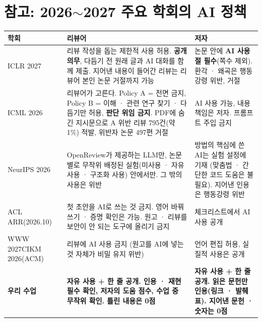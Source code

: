 \documentclass[11pt]{article}
\begin{document}
\section*{참고: 2026$\sim$2027 주요 학회의 AI 정책}
\begin{center}
\scriptsize
\renewcommand{\arraystretch}{1.35}
\begin{tabular}{@{}>{\raggedright\arraybackslash}p{2.0cm}>{\raggedright\arraybackslash}p{5.9cm}>{\raggedright\arraybackslash}p{5.3cm}@{}}
\toprule
\textbf{학회} & \textbf{리뷰어} & \textbf{저자} \\
\midrule
ICLR 2027 & 리뷰 작성을 돕는 제한적 사용 허용. \textbf{공개 의무}, 다듬기 전 원래 글과 AI 대화를 함께 제출. 지어낸 내용이 들어간 리뷰는 리뷰어 본인 논문 거절까지 가능 & 논문 안에 \textbf{AI 사용 절 필수}(쪽수 제외). 환각 · 왜곡은 행동강령 위반, 거절 \\
ICML 2026 & 리뷰어가 고른다. Policy A = 전면 금지, Policy B = 이해 · 관련 연구 찾기 · 다듬기만 허용, \textbf{판단 위임 금지}. PDF에 숨긴 지시문으로 A 위반 리뷰 795건(약 1\%) 적발, 위반자 논문 497편 거절 & AI 사용 가능, 내용 책임은 저자. 프롬프트 주입 금지 \\
NeurIPS 2026 & OpenReview가 제공하는 LLM만, 논문별로 무작위 배정된 실험(미사용 · 자유 사용 · 구조화 사용) 안에서만. 그 밖의 사용은 위반 & 방법의 핵심에 쓴 AI는 실험 설정에 기재 (맞춤법 · 간단한 코드 도움은 불필요). 지어낸 인용은 행동강령 위반 \\
ACL ARR\newline (2026.10) & 첫 초안을 AI로 쓰는 것 금지. 영어 바꿔 쓰기 · 증명 확인은 가능. 원고 · 리뷰를 보안이 안 되는 도구에 올리기 금지 & 체크리스트에서 AI 사용 공개 \\
WWW 2027\newline CIKM 2026\newline (ACM) & 리뷰에 AI 사용 금지 (원고를 AI에 넣는 것 자체가 비밀 유지 위반) & 언어 편집 허용, 실질적 사용은 공개 \\
\midrule
\textbf{우리 수업} & \textbf{자유 사용 + 한 줄 공개. 인용 · 재현 필수 확인, 저자의 도움 점수, 수업 중 무작위 확인. 틀린 내용은 0점} & \textbf{자유 사용 + 한 줄 공개. 읽은 문헌만 인용(링크 · 발췌 표). 지어낸 문헌 · 숫자는 0점} \\
\bottomrule
\end{tabular}
\end{center}
\end{document}
